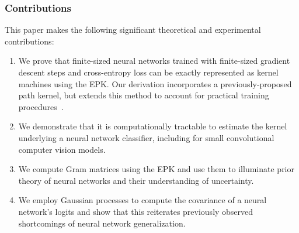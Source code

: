   \begin{frame}
    \frametitle{Contributions}
 This paper makes the following significant theoretical and experimental contributions:
 \begin{enumerate}
     \item We prove that finite-sized neural networks trained with finite-sized gradient descent steps and cross-entropy loss can be exactly represented as kernel machines using the EPK. Our derivation incorporates a previously-proposed path kernel, but extends this method to account for practical training procedures~\cite{domingos2020every, chen2021equivalence}.
  
     \item We demonstrate that it is computationally tractable to estimate the kernel underlying a neural network classifier, including for small convolutional computer vision models.
     \item We compute Gram matrices using the EPK and use them to illuminate prior theory of neural networks and their understanding of uncertainty. 
     \item We employ Gaussian processes to compute the covariance of a neural network's logits and show that this reiterates previously observed shortcomings of neural network generalization.
 \end{enumerate}
\end{frame}

  
